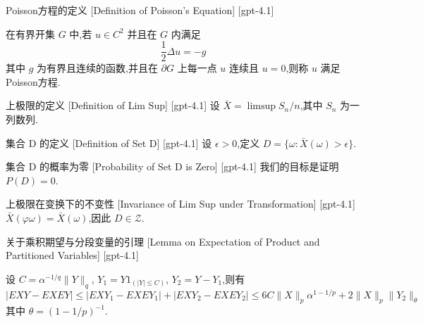 \documentclass[UTF8]{ctexart}
\begin{document}
    
    
    \begin{dfn}
        {Poisson方程的定义}
        [Definition of Poisson's Equation]
        [gpt-4.1]
        
在有界开集 $G$ 中,若 $u \in C^2$ 并且在 $G$ 内满足
\[{\scriptstyle \frac{1}{2}} \Delta u = -g\]
其中 $g$ 为有界且连续的函数,并且在 $\partial G$ 上每一点 $u$ 连续且 $u = 0$,则称 $u$ 满足Poisson方程.

    \end{dfn}
    
    
    
    \begin{dfn}
        {上极限的定义}
        [Definition of Lim Sup]
        [gpt-4.1]
        设 $\bar{X} = \limsup S_{n}/n$,其中 $S_n$ 为一列数列.
    \end{dfn}
    
    
    
    \begin{dfn}
        {集合 D 的定义}
        [Definition of Set D]
        [gpt-4.1]
        设 $\epsilon > 0$,定义 $D = \{\omega : \bar{X}(\omega) > \epsilon\}$.
    \end{dfn}
    
    
    
    \begin{thm}
        {集合 D 的概率为零}
        [Probability of Set D is Zero]
        [gpt-4.1]
        我们的目标是证明 $P(D) = 0$.
    \end{thm}
    
    
    
    \begin{ppt}
        {上极限在变换下的不变性}
        [Invariance of Lim Sup under Transformation]
        [gpt-4.1]
        $\bar{X}(\varphi \omega) = \bar{X}(\omega)$,因此 $D \in \mathcal{Z}$.
    \end{ppt}
    
    
    
    \begin{lma}
        {关于乘积期望与分段变量的引理}
        [Lemma on Expectation of Product and Partitioned Variables]
        [gpt-4.1]
        
设 $C = \alpha^{-1/q} \lVert Y \rVert_{q}$, $Y_{1} = Y 1_{( | Y | \leq C )}$, $Y_{2} = Y - Y_{1}$,则有
\[
| E X Y - E X E Y | \leq | E X Y_{1} - E X E Y_{1} | + | E X Y_{2} - E X E Y_{2} | 
\leq 6 C \| X \|_{p} \alpha^{1 - 1/p} + 2 \| X \|_{p} \| Y_{2} \|_{\theta}
\]
其中 $\theta = ( 1 - 1/p )^{-1}$.

    \end{lma}
    
\end{document}
